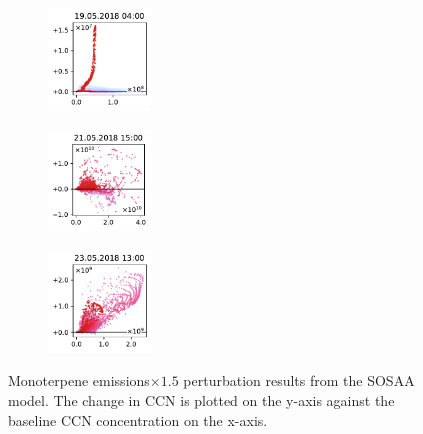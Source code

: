 \begin{figure}[H]
    \begin{subfigure}
        \centering
        \includegraphics[width=0.30\textwidth,valign=t]{evaluation/figures/perturbations/perturbation-19.05.2018:04.00-monoterpenes-mul-1.5.pdf}
    \end{subfigure}
    \begin{subfigure}
        \centering
        \includegraphics[width=0.30\textwidth,valign=t]{evaluation/figures/perturbations/perturbation-21.05.2018:15.00-monoterpenes-mul-1.5.pdf}
    \end{subfigure}
    \begin{subfigure}
        \centering
        \includegraphics[width=0.30\textwidth,valign=t]{evaluation/figures/perturbations/perturbation-23.05.2018:13.00-monoterpenes-mul-1.5.pdf}
    \end{subfigure}

    \caption[Monoterpene emissions$\times 1.5$ perturbation SOSAA results]{Monoterpene emissions$\times 1.5$ perturbation results from the SOSAA model. The change in CCN is plotted on the y-axis against the baseline CCN concentration on the x-axis.}
    \label{fig:sosaa-perturbation-monoterpenes-mul-1.5}
\end{figure}

